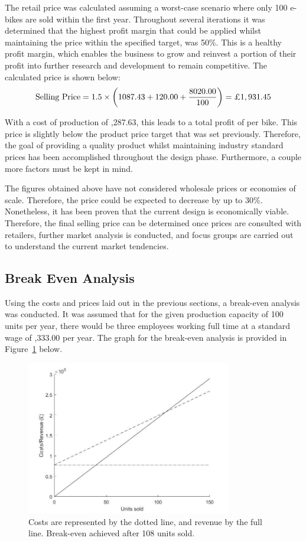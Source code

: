 \documentclass[a4paper,11pt]{article}
\begin{document}
The retail price was calculated assuming a worst-case scenario where only 100 e-bikes are sold within the first year. Throughout several iterations it was determined that the highest profit margin that could be applied whilst maintaining the price within the specified target, was 50\%. This is a healthy profit margin, which enables the business to grow and reinvest a portion of their profit into further research and development to remain competitive. The calculated price is shown below: 
\[
	\text{Selling Price} = 1.5 \times \left(1087.43+120.00+\frac{8020.00}{100}\right) =\text{\textsterling}1,931.45
\]

With a cost of production of ,287.63, this leads to a total profit of  per bike. This price is slightly below the product price target that was set previously. Therefore, the goal of providing a quality product whilst maintaining industry standard prices has been accomplished throughout the design phase. Furthermore, a couple more factors must be kept in mind. 

The figures obtained above have not considered wholesale prices or economies of scale. Therefore, the price could be expected to decrease by up to 30\%. Nonetheless, it has been proven that the current design is economically viable. Therefore, the final selling price can be determined once prices are consulted with retailers, further market analysis is conducted, and focus groups are carried out to understand the current market tendencies.  

\subsection{Break Even Analysis}

Using the costs and prices laid out in the previous sections, a break-even analysis was conducted. It was assumed that for the given production capacity of 100 units per year, there would be three employees working full time at a standard wage of ,333.00 per year. The graph for the break-even analysis is provided in Figure~\ref{fig:roi} below.

\begin{figure}[!ht]
	\centering
	\includegraphics[width=0.8\textwidth]{geg2}
	\caption{Costs are represented by the dotted line, and revenue by the full line. Break-even achieved after 108 units sold.}
	\label{fig:roi}
\end{figure}
\end{document}
